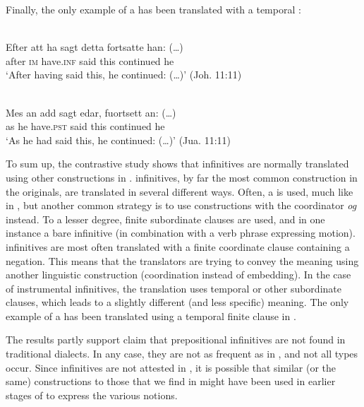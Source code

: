 \documentclass[output=paper]{langscibook}
\begin{document}
Finally, the only example of a  has been translated with a temporal : 


\ea
\label{ex:kalm:30}
\ea {}\label{ex:kalm:30a}\\ 
\gll Efter att ha sagt detta fortsatte han: (…)\\
 after \textsc{im} have.\textsc{inf} said this continued he\\
\glt ‘After having said this, he continued: (…)’ (Joh. 11:11)

\ex {}\label{ex:kalm:30b}\\
\gll Mes an add sagt edar, fuortsett an: (…)\\
 as he have.\textsc{pst} said this continued he\\
\glt ‘As he had said this, he continued: (…)’ (Jua. 11:11)
\z
\z 


To sum up, the contrastive study shows that   infinitives are normally translated using other constructions in .  infinitives, by far the most common construction in the  originals, are translated in several different ways. Often, a  is used, much like in , but another common strategy is to use constructions with the coordinator \textit{og} instead. To a lesser degree, finite subordinate clauses are used, and in one instance a bare infinitive (in combination with a verb phrase expressing motion).  infinitives are most often translated with a finite coordinate clause containing a negation. This means that the translators are trying to convey the  meaning using another linguistic construction (coordination instead of embedding). In the case of instrumental infinitives, the translation uses temporal or other subordinate clauses, which leads to a slightly different (and less specific) meaning. The only example of a  has been translated using a temporal finite clause in . 

The results partly support  claim that prepositional infinitives are not found in traditional dialects. In any case, they are not as frequent as in , and not all types occur. Since  infinitives are not attested in , it is possible that similar (or the same) constructions to those that we find in  might have been used in earlier stages of  to express the various  notions. 
\end{document}
